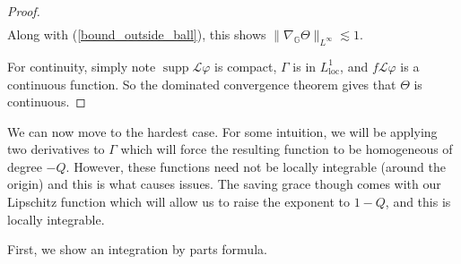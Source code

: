 \documentclass[12pt,a4paper,reqno]{amsart}
\DeclareMathOperator{\supp}{supp}
\newcommand{\cg}{\Gamma}
\renewcommand{\L}{\mathcal{L}}
\newcommand{\G}{\mathbb{G}}
\numberwithin{equation}{section}
\theoremstyle{definition}
\begin{document}
\begin{proof}
\begin{align*}
\end{align*}
Along with (\ref{bound_outside_ball}), this shows $\| \nabla_{\G} \Theta \|_{L^{\infty}} \lesssim 1$.

For continuity, simply note $\supp \L \varphi$ is compact, $\cg$ is in $L_{\text{loc}}^1$, and $f \L \varphi$ is a continuous function. So the dominated convergence theorem gives that $\Theta$ is continuous.


\end{proof}

We can now move to the hardest case. For some intuition, we will be applying two derivatives to $\cg$ which will force the resulting function to be homogeneous of degree $-Q$. However, these functions need not be locally integrable (around the origin) and this is what causes issues. The saving grace though comes with our Lipschitz function which will allow us to raise the exponent to $1-Q$, and this is locally integrable.

First, we show an integration by parts formula. 
\end{document}
